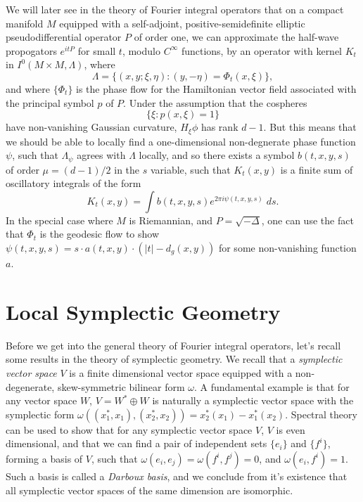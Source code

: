 \begin{example}
    We will later see in the theory of Fourier integral operators that on a compact manifold $M$ equipped with a self-adjoint, positive-semidefinite elliptic pseudodifferential operator $P$ of order one, we can approximate the half-wave propogators $e^{itP}$ for small $t$, modulo $C^\infty$ functions, by an operator with kernel $K_t$ in $I^0(M \times M,\Lambda)$, where
    \[ \Lambda = \{ (x,y;\xi,\eta) : (y,-\eta) = \Phi_t(x,\xi) \}, \]
    and where $\{ \Phi_t \}$ is the phase flow for the Hamiltonian vector field associated with the principal symbol $p$ of $P$. Under the assumption that the cospheres
    \[ \{ \xi: p(x,\xi) = 1 \} \]
    have non-vanishing Gaussian curvature, $H_\xi \phi$ has rank $d-1$. But this means that we should be able to locally find a one-dimensional non-degnerate phase function $\psi$, such that $\Lambda_\psi$ agrees with $\Lambda$ locally, and so there exists a symbol $b(t,x,y,s)$ of order $\mu = (d-1)/2$ in the $s$ variable, such that $K_t(x,y)$ is a finite sum of oscillatory integrals of the form
    \[ K_t(x,y) = \int b(t,x,y,s) e^{2 \pi i \psi(t,x,y,s)}\; ds. \]
    In the special case where $M$ is Riemannian, and $P = \sqrt{-\Delta}$, one can use the fact that $\Phi_t$ is the geodesic flow to show $\psi(t,x,y,s) = s \cdot a(t,x,y) \cdot ( |t| - d_g(x,y) )$ for some non-vanishing function $a$.
\end{example}

\section{Local Symplectic Geometry}

Before we get into the general theory of Fourier integral operators, let's recall some results in the theory of symplectic geometry. We recall that a \emph{symplectic vector space} $V$ is a finite dimensional vector space equipped with a non-degenerate, skew-symmetric bilinear form $\omega$. A fundamental example is that for any vector space $W$, $V = W^* \oplus W$ is naturally a symplectic vector space with the symplectic form $\omega((x^*_1,x_1),(x^*_2,x_2)) = x^*_2(x_1) - x^*_1(x_2)$. Spectral theory can be used to show that for any symplectic vector space $V$, $V$ is even dimensional, and that we can find a pair of independent sets $\{ e_i \}$ and $\{ f^i \}$, forming a basis of $V$, such that $\omega(e_i,e_j) = \omega(f^i,f^j) = 0$, and $\omega(e_i,f^i) = 1$. Such a basis is called a \emph{Darboux basis}, and we conclude from it's existence that all symplectic vector spaces of the same dimension are isomorphic.

